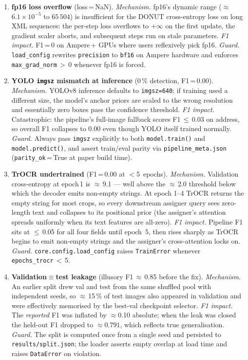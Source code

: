 \documentclass[conference]{IEEEtran}
\begin{document}
\begin{enumerate}
\item \textbf{fp16 loss overflow} (loss\,=\,NaN).
  \textit{Mechanism.} fp16's dynamic range
  ($\approx$\,$6.1{\times}10^{-5}$ to $65\,504$) is insufficient for
  the DONUT cross-entropy loss on long XML sequences: the per-step
  loss overflows to $+\infty$ on the first update, the gradient
  scaler aborts, and subsequent steps run on stale parameters.
  \textit{F1 impact.} F1\,=\,0 on Ampere\,+ GPUs where users
  reflexively pick fp16.  \textit{Guard.} \texttt{load\_config}
  rewrites \texttt{precision} to \texttt{bf16} on Ampere hardware
  and enforces \texttt{max\_grad\_norm}\,$>$\,0 whenever fp16 is
  forced.

\item \textbf{YOLO \texttt{imgsz} mismatch at inference}
  (0\,\% detection, F1\,=\,0.00).
  \textit{Mechanism.} YOLOv8 inference defaults to
  \texttt{imgsz=640}; if training used a different size, the model's
  anchor priors are scaled to the wrong resolution and essentially
  zero boxes pass the confidence threshold.  \textit{F1 impact.}
  Catastrophic: the pipeline's full-image fallback scores
  F1\,$\leq$\,0.03 on address, so overall F1 collapses to 0.00
  even though YOLO itself trained normally.  \textit{Guard.} Always
  pass \texttt{imgsz} explicitly to both \texttt{model.train()} and
  \texttt{model.predict()}, and assert train/eval parity via
  \texttt{pipeline\_meta.json}
  (\texttt{parity\_ok}\,=\,True at paper build time).

\item \textbf{TrOCR undertrained} (F1\,=\,0.00 at $<$5~epochs).
  \textit{Mechanism.} Validation cross-entropy at epoch\,1 is
  $\approx$\,9.1 --- well above the $\approx$\,2.0 threshold below
  which the decoder emits non-empty strings.  At epoch 1--4 TrOCR
  returns the empty string for most crops, so every downstream
  assigner query sees zero-length text and collapses to its positional
  prior (the assigner's attention spreads uniformly when its text
  features are all-zero).  \textit{F1 impact.} Pipeline F1 sits at
  $\leq$\,0.05 for all four fields until epoch~5, then rises sharply
  as TrOCR begins to emit non-empty strings and the assigner's
  cross-attention locks on.  \textit{Guard.}
  \texttt{core.config.load\_config} raises \texttt{TrainError}
  whenever \texttt{epochs\_trocr}\,$<$\,5.

\item \textbf{Validation$\equiv$test leakage}
  (illusory F1\,$\approx$\,0.85 before the fix).
  \textit{Mechanism.} An earlier split drew val and test from the same
  shuffled pool with independent seeds, so $\approx$\,15\,\% of test
  images also appeared in validation and were effectively memorised
  by the best-val checkpoint selector.  \textit{F1 impact.} The
  \emph{reported} F1 was inflated by $\approx$0.10 absolute; when the
  leak was closed the held-out F1 dropped to $\approx 0.791$, which
  reflects true generalisation.  \textit{Guard.} The split is
  computed once from a single seed and persisted to
  \texttt{results/split.json}; the loader asserts empty overlap at
  load time and raises \texttt{DataError} on violation.


\end{enumerate}
\end{document}
